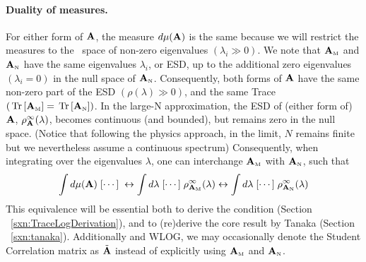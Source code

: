 \paragraph{Duality of measures.}
For either form of $\mathbf{A}$, the measure $d\mu(\mathbf{A})$ is the same because we will restrict the measures to the~\ECS
space of non-zero eigenvalues $(\lambda_{i}\gg 0)$.
We note that ${\mathbf{A}}_{\text{\tiny M}}$ and ${\mathbf{A}}_{\text{\tiny N}}$ have the same eigenvalues $\lambda_{i}$, or ESD,
up to the additional zero eigenvalues $(\lambda_{i}=0)$ in the null space of ${\mathbf{A}}_{\text{\tiny N}}$.  
Consequently, both forms of $\mathbf{A}$ have 
the same non-zero part
of the ESD $(\rho(\lambda)\gg 0)$, and the same Trace $(\mbox{}\operatorname{Tr}\left[{\mathbf{A}}_{\text{\tiny M}}\right]=\mbox{}\operatorname{Tr}\left[{\mathbf{A}}_{\text{\tiny N}}\right])$.
In the large-N approximation, the ESD of (either form of)
$\mathbf{A}$, $\rho^{\infty}_{\mathbf{A}}(\lambda)$,
becomes continuous (and bounded), but remains zero in the null space.
(Notice that following the physics approach, in the limit, $N$ remains finite but we nevertheless assume a continuous spectrum)
Consequently,
when integrating over the eigenvalues  $\lambda$, one can interchange
${\mathbf{A}}_{\text{\tiny M}}$  with ${\mathbf{A}}_{\text{\tiny N}}$, such that
\begin{align}
 \int d\mu(\mathbf{A})\;[\cdots]\;\leftrightarrow  \int d\lambda\;[\cdots]\; \rho^{\infty}_{{\mathbf{A}}_{\text{\tiny M}}}(\lambda) \leftrightarrow  \int d\lambda\;[\cdots]\; \rho^{\infty}_{{\mathbf{A}}_{\text{\tiny N}}}(\lambda)
\end{align}
This equivalence will be essential both to derive the \TRACELOG condition (Section ~\ref{sxn:TraceLogDerivation}),
and to (re)derive the core result by Tanaka (Section ~\ref{sxn:tanaka}).
Additionally and WLOG, we may occasionally denote the Student Correlation matrix as
$\tilde{\mathbf{A}}$ instead of explicitly using  ${\mathbf{A}}_{\text{\tiny M}}$ and ${\mathbf{A}}_{\text{\tiny N}}$.

